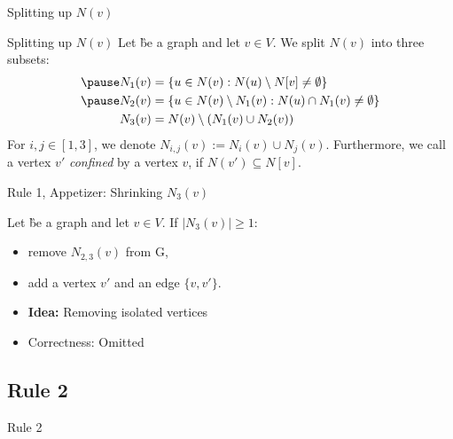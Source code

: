 \begin{frame}[c]{Splitting up $N(v)$}
    \begin{figure}[!ht]
    \end{figure}
\end{frame}
\begin{frame}[c]{Splitting up $N(v)$}
 Let \G be a graph and let $v \in V$. We split $N(v)$ into three subsets:
    \begin{align}
        \pause N_1(v) & = \{u \in N(v) : N(u) \setminus N[v] \neq \emptyset \}              \\
        \pause N_2(v) & = \{u \in N(v)\setminus N_1(v) : N(u) \cap N_1(v) \neq \emptyset \} \\
        N_3(v) & = N(v) \setminus (N_1(v) \cup N_2(v))
    \end{align}
    For $i,j \in [1,3]$, we denote $N_{i,j} (v) := N_i(v) \cup N_j(v)$. Furthermore, we call a vertex $v'$ \textit{confined} by a vertex $v$, if $N(v') \subseteq N[v]$.
\end{frame}


\begin{frame}[c]{Rule 1, Appetizer: Shrinking $N_3(v)$}

    \begin{tcolorbox}[colback=TUMBlueLighter,title=]
        Let \G be a graph and let $v \in V$. If $|N_3(v)| \geq 1$:
        \begin{itemize}
            \item remove $N_{2,3}(v)$ from G,
            \item add a vertex $v'$ and an edge $\{v, v'\}$.
        \end{itemize}
    \end{tcolorbox}

    \begin{figure}[!ht]
    \end{figure}
    \begin{itemize}
        \item \textbf{Idea: } Removing isolated vertices
        \item Correctness: Omitted
    \end{itemize}
\end{frame}

\subsection{Rule 2}
\begin{frame}[c]{Rule 2}
    \begin{figure}[!ht]
    \end{figure}
\end{frame}

